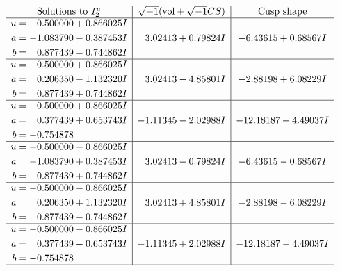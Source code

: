 \documentclass[1p]{elsarticle_modified}
\theoremstyle{definition}
\newcommand{\I}{\sqrt{-1}}
\begin{document}
$$\begin{array}{c|c|c}  
\text{Solutions to }I^u_{2}& \I (\text{vol} + \sqrt{-1}CS) & \text{Cusp shape}\\
 \hline 
\begin{aligned}
u &= -0.500000 + 0.866025 I \\
a &= -1.083790 - 0.387453 I \\
b &= \phantom{-}0.877439 - 0.744862 I\end{aligned}
 & \phantom{-}3.02413 + 0.79824 I & -6.43615 + 0.68567 I \\ \hline\begin{aligned}
u &= -0.500000 + 0.866025 I \\
a &= \phantom{-}0.206350 - 1.132320 I \\
b &= \phantom{-}0.877439 + 0.744862 I\end{aligned}
 & \phantom{-}3.02413 - 4.85801 I & -2.88198 + 6.08229 I \\ \hline\begin{aligned}
u &= -0.500000 + 0.866025 I \\
a &= \phantom{-}0.377439 + 0.653743 I \\
b &= -0.754878\phantom{ +0.000000I}\end{aligned}
 & -1.11345 - 2.02988 I & -12.18187 + 4.49037 I \\ \hline\begin{aligned}
u &= -0.500000 - 0.866025 I \\
a &= -1.083790 + 0.387453 I \\
b &= \phantom{-}0.877439 + 0.744862 I\end{aligned}
 & \phantom{-}3.02413 - 0.79824 I & -6.43615 - 0.68567 I \\ \hline\begin{aligned}
u &= -0.500000 - 0.866025 I \\
a &= \phantom{-}0.206350 + 1.132320 I \\
b &= \phantom{-}0.877439 - 0.744862 I\end{aligned}
 & \phantom{-}3.02413 + 4.85801 I & -2.88198 - 6.08229 I \\ \hline\begin{aligned}
u &= -0.500000 - 0.866025 I \\
a &= \phantom{-}0.377439 - 0.653743 I \\
b &= -0.754878\phantom{ +0.000000I}\end{aligned}
 & -1.11345 + 2.02988 I & -12.18187 - 4.49037 I\\
 \hline 
 \end{array}$$\newpage
\end{document}
